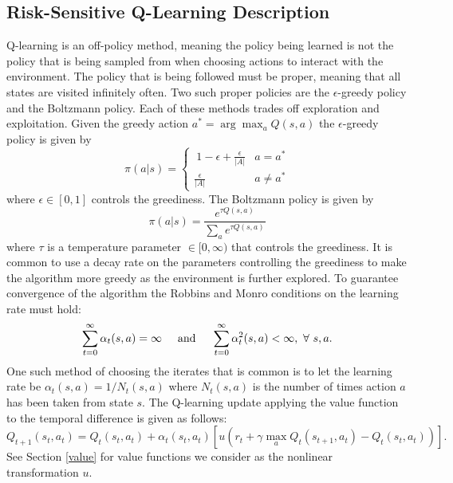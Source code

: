 \documentclass{article}
\begin{document}
\subsection{Risk-Sensitive Q-Learning Description}\label{alg_desc}
Q-learning is an off-policy method, meaning the policy being learned is not the policy that is being sampled from when choosing actions to interact with the environment. The policy that is being followed must be proper, meaning that all states are visited infinitely often. Two such proper policies are the $\epsilon$-greedy policy and the Boltzmann policy. Each of these methods trades off exploration and exploitation. Given the greedy action $a^* = \arg \max_a Q(s, a)$ the $\epsilon$-greedy policy is given by
\begin{equation} \pi(a|s) =
\begin{cases}
\ 1 - \epsilon + \frac{\epsilon}{|A|} & a = a^* \\
\frac{\epsilon}{|A|} & a \neq a^*
\end{cases}
\end{equation}
where $\epsilon \in [0, 1]$ controls the greediness. The Boltzmann policy is given by
\begin{equation} \pi(a|s) =
\frac{e^{\tau Q(s, a)}}{\sum_a e^{\tau Q(s, a)}} 
\end{equation}
where $\tau$ is a temperature parameter $\in [0, \infty)$ that controls the greediness. It is common to use a decay rate on the parameters controlling the greediness to make the algorithm more greedy as the environment is further explored. To guarantee convergence of the algorithm the Robbins and Monro conditions \cite{robbins1951stochastic} on the learning rate must hold:
\begin{equation}
\sum_{t=0}^\infty \alpha_t(s, a) = \infty \hspace{5mm} \text{and} \hspace{5mm} \sum_{t=0}^\infty \alpha_t^2(s, a) < \infty, \ \forall \ s, a.
\end{equation}
One such method of choosing the iterates that is common is to let the learning rate be ${\alpha_t(s, a) = 1/N_t(s, a)}$ where $N_t(s, a)$ is the number of times action $a$ has been taken from state $s$. The Q-learning update applying the value function to the temporal difference is given as follows:
\begin{equation}
Q_{t+1}(s_t, a_t) = Q_t(s_t, a_t) + \alpha_t(s_t, a_t)\left[u(r_t + \gamma \max_a Q_t(s_{t+1}, a_t) - Q_t(s_t, a_t))\right].
\end{equation}
See Section \ref{value} for value functions we consider as the nonlinear transformation $u$.
\end{document}
